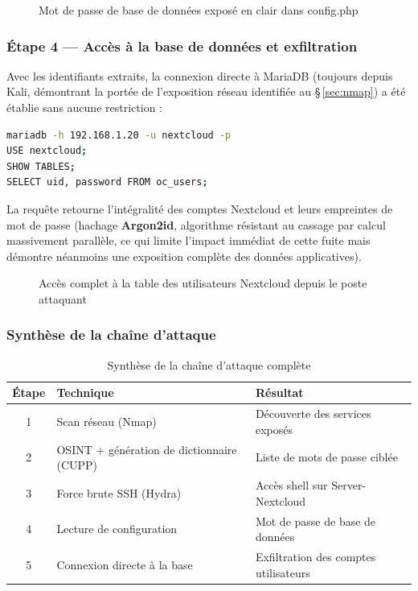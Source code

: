 \begin{figure}[h]
\centering
\caption{Mot de passe de base de données exposé en clair dans config.php}
\label{fig:config-leak}
\end{figure}

\subsubsection{Étape 4 --- Accès à la base de données et exfiltration}

Avec les identifiants extraits, la connexion directe à MariaDB (toujours
depuis Kali, démontrant la portée de l'exposition réseau identifiée au
\S\,\ref{sec:nmap}) a été établie sans aucune restriction :

\begin{lstlisting}[language=bash, caption={Connexion à la base de données avec les identifiants extraits}]
mariadb -h 192.168.1.20 -u nextcloud -p
USE nextcloud;
SHOW TABLES;
SELECT uid, password FROM oc_users;
\end{lstlisting}

La requête retourne l'intégralité des comptes Nextcloud et leurs
empreintes de mot de passe (hachage \textbf{Argon2id}, algorithme
résistant au cassage par calcul massivement parallèle, ce qui limite
l'impact immédiat de cette fuite mais démontre néanmoins une exposition
complète des données applicatives).

\begin{figure}[h]
\centering
\caption{Accès complet à la table des utilisateurs Nextcloud depuis le poste attaquant}
\label{fig:mariadb-access}
\end{figure}

\subsubsection{Synthèse de la chaîne d'attaque}

\begin{table}[h]
\centering
\begin{tabular}{|c|l|l|}
\hline
\textbf{Étape} & \textbf{Technique} & \textbf{Résultat} \\
\hline
1 & Scan réseau (Nmap) & Découverte des services exposés \\
2 & OSINT + génération de dictionnaire (CUPP) & Liste de mots de passe ciblée \\
3 & Force brute SSH (Hydra) & Accès shell sur Server-Nextcloud \\
4 & Lecture de configuration & Mot de passe de base de données \\
5 & Connexion directe à la base & Exfiltration des comptes utilisateurs \\
\hline
\end{tabular}
\caption{Synthèse de la chaîne d'attaque complète}
\label{tab:synthese-attaque}
\end{table}

